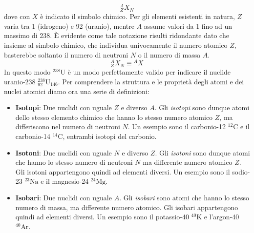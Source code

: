     \begin{equation*}
        {}^A_Z X_N
    \end{equation*}
dove con $X$ è indicato il simbolo chimico. Per gli elementi esistenti in natura, $Z$ varia tra 1 (idrogeno) e 92 (uranio), mentre $A$ assume valori da 1 fino ad un massimo di 238. È evidente come tale notazione risulti ridondante dato che insieme al simbolo chimico, che individua univocamente il numero atomico $Z$, basterebbe soltanto il numero di neutroni $N$ o il numero di massa $A$.
    \begin{equation*}
        {}^A_Z X_N \equiv {}^{A}X 
    \end{equation*}
In questo modo ${}^{238} \text{U}$ è un modo perfettamente valido per indicare il nuclide uranio-238 ${}^{238}_{92} \text{U}_{146}$. Per comprendere la struttura e le proprietà degli atomi e dei nuclei atomici diamo ora una serie di definizioni:
    \begin{itemize}
        \item \textbf{Isotopi}: Due nuclidi con uguale $Z$ e diverso $A$. Gli \textit{isotopi} sono dunque atomi dello stesso elemento chimico che hanno lo stesso numero atomico $Z$, ma differiscono nel numero di neutroni $N$. Un esempio sono il carbonio-12 ${}^{12} \text{C}$ e il carbonio-14 ${}^{14} \text{C}$, entrambi isotopi del carbonio.
        \item \textbf{Isotoni}: Due nuclidi con uguale $N$ e diverso $Z$. Gli \textit{isotoni} sono dunque atomi che hanno lo stesso numero di neutroni $N$ ma differente numero atomico $Z$. Gli isotoni appartengono quindi ad elementi diversi. Un esempio sono il sodio-23 ${}^{23} \text{Na}$ e il magnesio-24 ${}^{24} \text{Mg}$.
        \item \textbf{Isobari}: Due nuclidi con uguale $A$. Gli \textit{isobari} sono atomi che hanno lo stesso numero di massa, ma differente numero atomico. Gli isobari appartengono quindi ad elementi diversi. Un esempio sono il potassio-40 ${}^{40} \text{K}$ e l'argon-40 ${}^{40} \text{Ar}$.
    \end{itemize}

